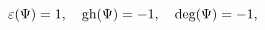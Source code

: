 \begin{equation}\label{6.6}
\varepsilon(\Psi)=1,\quad\hbox{gh}(\Psi)=-1,\quad\hbox{deg}(\Psi)=-1,
\end{equation}

